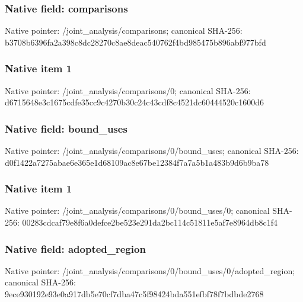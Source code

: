 \documentclass[10pt,a4paper]{article}
\begin{document}
\subsubsection{Native field: comparisons}
Native pointer: /joint\_\allowbreak{}analysis/comparisons; canonical SHA-256: b3708b6396fa2a398c8dc28270c8ae8deac540762f4bd985475b896abf977bfd

\subsubsection{Native item 1}
Native pointer: /joint\_\allowbreak{}analysis/comparisons/0; canonical SHA-256: d6715648e3c1675cdfe35cc9c4270b30c24c43cdf8c4521dc60444520c1600d6

\subsubsection{Native field: bound\_\allowbreak{}uses}
Native pointer: /joint\_\allowbreak{}analysis/comparisons/0/bound\_\allowbreak{}uses; canonical SHA-256: d0f1422a7275abae6e365e1d68109ac8e67be12384f7a7a5b1a483b9d6b9ba78

\subsubsection{Native item 1}
Native pointer: /joint\_\allowbreak{}analysis/comparisons/0/bound\_\allowbreak{}uses/0; canonical SHA-256: 00283cdcaf79e8f6a0defce2be523e291da2bc114c51811e5af7e8964db8c1f4

\subsubsection{Native field: adopted\_\allowbreak{}region}
Native pointer: /joint\_\allowbreak{}analysis/comparisons/0/bound\_\allowbreak{}uses/0/adopted\_\allowbreak{}region; canonical SHA-256: 9ece930192e93e0a917db5e70cf7dba47c5f98424bda551efbf78f7bdbde2768
\end{document}
